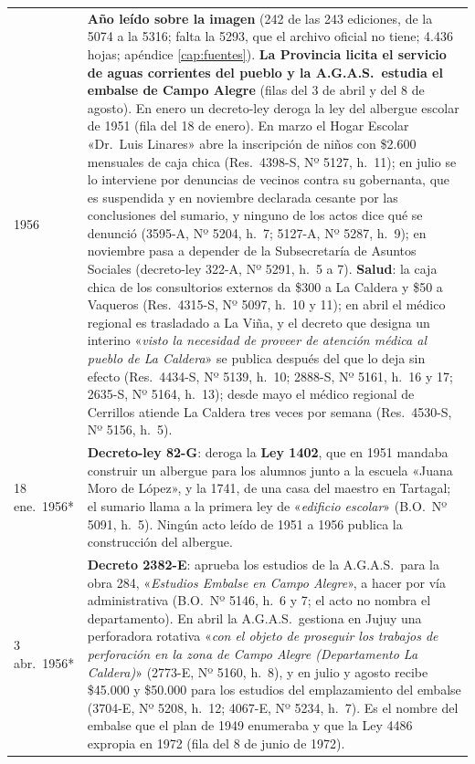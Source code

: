 \begin{longtable}{@{}p{2.7cm}p{10.3cm}@{}}
1956 & \textbf{Año leído sobre la imagen} (242 de las 243 ediciones, de la 5074 a la 5316; falta la 5293, que el archivo oficial no tiene; 4.436 hojas; apéndice \ref{cap:fuentes}). \textbf{La Provincia licita el servicio de aguas corrientes del pueblo y la A.G.A.S.\ estudia el embalse de Campo Alegre} (filas del 3 de abril y del 8 de agosto). En enero un decreto-ley deroga la ley del albergue escolar de 1951 (fila del 18 de enero). En marzo el Hogar Escolar «Dr.\ Luis Linares» abre la inscripción de niños con \$2.600 mensuales de caja chica (Res.\ 4398-S, Nº 5127, h.\ 11); en julio se lo interviene por denuncias de vecinos contra su gobernanta, que es suspendida y en noviembre declarada cesante por las conclusiones del sumario, y ninguno de los actos dice qué se denunció (3595-A, Nº 5204, h.\ 7; 5127-A, Nº 5287, h.\ 9); en noviembre pasa a depender de la Subsecretaría de Asuntos Sociales (decreto-ley 322-A, Nº 5291, h.\ 5 a 7). \textbf{Salud}: la caja chica de los consultorios externos da \$300 a La Caldera y \$50 a Vaqueros (Res.\ 4315-S, Nº 5097, h.\ 10 y 11); en abril el médico regional es trasladado a La Viña, y el decreto que designa un interino «\textit{visto la necesidad de proveer de atención médica al pueblo de La Caldera}» se publica después del que lo deja sin efecto (Res.\ 4434-S, Nº 5139, h.\ 10; 2888-S, Nº 5161, h.\ 16 y 17; 2635-S, Nº 5164, h.\ 13); desde mayo el médico regional de Cerrillos atiende La Caldera tres veces por semana (Res.\ 4530-S, Nº 5156, h.\ 5). \\
18 ene.\ 1956* & \textbf{Decreto-ley 82-G}: deroga la \textbf{Ley 1402}, que en 1951 mandaba construir un albergue para los alumnos junto a la escuela «Juana Moro de López», y la 1741, de una casa del maestro en Tartagal; el sumario llama a la primera ley de «\textit{edificio escolar}» (B.O.\ Nº 5091, h.\ 5). Ningún acto leído de 1951 a 1956 publica la construcción del albergue. \\
3 abr.\ 1956* & \textbf{Decreto 2382-E}: aprueba los estudios de la A.G.A.S.\ para la obra 284, «\textit{Estudios Embalse en Campo Alegre}», a hacer por vía administrativa (B.O.\ Nº 5146, h.\ 6 y 7; el acto no nombra el departamento). En abril la A.G.A.S.\ gestiona en Jujuy una perforadora rotativa «\textit{con el objeto de proseguir los trabajos de perforación en la zona de Campo Alegre (Departamento La Caldera)}» (2773-E, Nº 5160, h.\ 8), y en julio y agosto recibe \$45.000 y \$50.000 para los estudios del emplazamiento del embalse (3704-E, Nº 5208, h.\ 12; 4067-E, Nº 5234, h.\ 7). Es el nombre del embalse que el plan de 1949 enumeraba y que la Ley 4486 expropia en 1972 (fila del 8 de junio de 1972). \\

\end{longtable}
